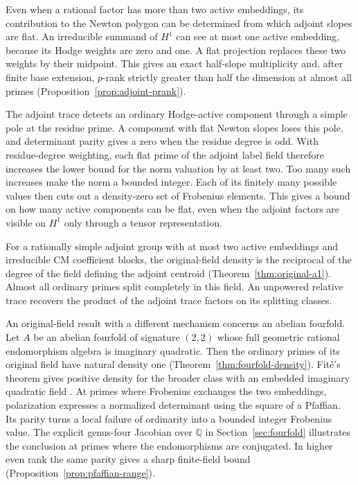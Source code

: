 \documentclass[11pt]{article}
\theoremstyle{definition}
\newcommand{\Q}{\mathbb Q}
\begin{document}
Even when a rational factor has more than two active embeddings, its
contribution to the Newton polygon can be determined from which
adjoint slopes are flat. An irreducible summand of \(H^1\) can see
at most one active embedding, because its Hodge weights are zero and
one. A flat projection replaces these two weights by their midpoint.
This gives an exact half-slope multiplicity and, after finite base
extension, \(p\)-rank strictly greater than half the dimension at
almost all primes (Proposition~\ref{prop:adjoint-prank}).

The adjoint trace detects an ordinary Hodge-active component through
a simple pole at the residue prime. A component with flat Newton
slopes loses this pole, and determinant parity gives a zero when the
residue degree is odd. With residue-degree weighting, each flat prime
of the adjoint label field therefore increases the lower bound for
the norm valuation by at least two. Too many such increases make the
norm a bounded integer. Each of its
finitely many possible values then cuts out a density-zero set of
Frobenius elements. This gives a bound on how many active components
can be flat, even when the adjoint factors are visible on \(H^1\)
only through a tensor representation.

For a rationally simple adjoint group with at most two active
embeddings and irreducible CM coefficient blocks, the original-field
density is the reciprocal of the degree of the field defining the
adjoint centroid (Theorem~\ref{thm:original-a1}). Almost all ordinary
primes split completely in this field. An unpowered relative trace
recovers the product of the adjoint trace factors on its splitting
classes.

An original-field result with a different mechanism concerns an
abelian fourfold. Let \(A\) be
an abelian fourfold of signature \((2,2)\) whose full geometric
rational endomorphism algebra is imaginary quadratic. Then the ordinary
primes of its original field have natural density one
(Theorem~\ref{thm:fourfold-density}). Fité's theorem gives positive
density for the broader class with an embedded imaginary quadratic
field \cite[Theorem~4 and \S8]{fite}. At primes where Frobenius exchanges
the two embeddings, polarization expresses a normalized determinant
using the square of a Pfaffian. Its parity turns a local failure of
ordinarity into a bounded integer Frobenius value. The explicit
genus-four Jacobian over \(\Q\) in Section~\ref{sec:fourfold} illustrates
the conclusion at primes where the endomorphisms are conjugated. In
higher even rank the same parity gives a sharp finite-field bound
(Proposition~\ref{prop:pfaffian-range}).
\end{document}
